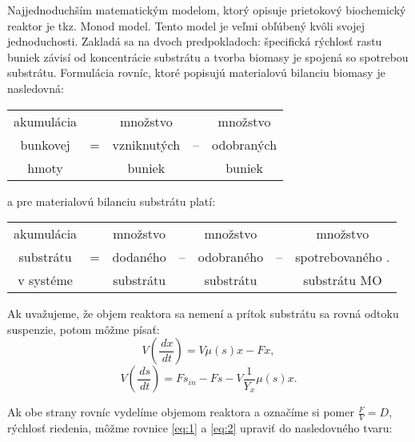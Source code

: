 Najjednoduchším matematickým modelom, ktorý opisuje prietokový biochemický reaktor je tkz. Monod model.
Tento model je veľmi obľúbený kvôli svojej jednoduchosti. Zakladá sa na dvoch predpokladoch:  špecifická rýchlosť rastu buniek závisí od koncentrácie substrátu a   tvorba biomasy je spojená so spotrebou substrátu. Formulácia rovníc, ktoré popisujú materialovú bilanciu biomasy je nasledovná:
\begin{table}[H]
	\centering
	\begin{tabular}{ccccc}
		akumulácia & & množstvo & & množstvo \\
		bunkovej & = & vzniknutých & -- & odobraných \\
		hmoty & & buniek & & buniek \\
	\end{tabular}
\end{table}
\noindent a pre materialovú bilanciu substrátu platí:
\begin{table}[H]
	\centering
	\begin{tabular}{ccccccc}
		akumulácia & & množstvo & & množstvo & & množstvo\\
		substrátu & = & dodaného & -- & odobraného & -- & spotrebovaného .\\
		v systéme & & substrátu & & substrátu & & substrátu MO\\
	\end{tabular}
\end{table}
\noindent Ak uvažujeme, že objem reaktora sa nemení a prítok substrátu sa rovná odtoku suspenzie, potom môžme písať: 
\begin{equation} \label{eq:1}
	V\left(\frac{\,dx}{\,dt}\right) = V\mu(s)x - Fx,
\end{equation}
\begin{equation} \label{eq:2}
	V\left(\frac{\,ds}{\,dt}\right) = Fs_{in} - Fs - V\frac{1}{Y_{x}}\mu(s)x.
\end{equation}

\noindent Ak obe strany rovníc vydelíme objemom reaktora a označíme si pomer $\frac{F}{V} = D$, rýchlosť riedenia, môžme rovnice \ref{eq:1} a \ref{eq:2} upraviť do nasledovného tvaru:

